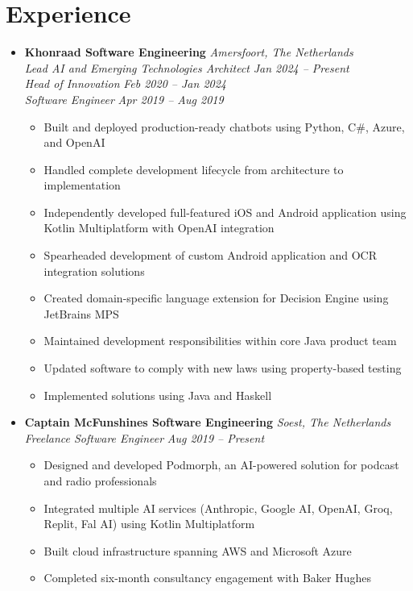 \documentclass[11pt,a4paper]{article}
\begin{document}
\section{Experience}
\begin{itemize}[leftmargin=0pt,label={},itemsep=2em]  %
\item \textbf{Khonraad Software Engineering} \hfill \textit{Amersfoort, The Netherlands}\\[2pt]
\textit{Lead AI and Emerging Technologies Architect} \hfill \textit{Jan 2024 -- Present}\\[2pt]
\textit{Head of Innovation} \hfill \textit{Feb 2020 -- Jan 2024}\\[2pt]
\textit{Software Engineer} \hfill \textit{Apr 2019 -- Aug 2019}\\[1pt]
\begin{itemize}[leftmargin=*,topsep=0pt,parsep=0pt,partopsep=0pt]
    \item Built and deployed production-ready chatbots using Python, C\#, Azure, and OpenAI
    \item Handled complete development lifecycle from architecture to implementation
    \item Independently developed full-featured iOS and Android application using Kotlin Multiplatform with OpenAI integration
    \item Spearheaded development of custom Android application and OCR integration solutions
    \item Created domain-specific language extension for Decision Engine using JetBrains MPS
    \item Maintained development responsibilities within core Java product team
    \item Updated software to comply with new laws using property-based testing
    \item Implemented solutions using Java and Haskell
\end{itemize}

\item \textbf{Captain McFunshines Software Engineering} \hfill \textit{Soest, The Netherlands}\\[2pt]
\textit{Freelance Software Engineer} \hfill \textit{Aug 2019 -- Present}\\[1pt]
\begin{itemize}[leftmargin=*,topsep=0pt,parsep=0pt,partopsep=0pt]
    \item Designed and developed Podmorph, an AI-powered solution for podcast and radio professionals
    \item Integrated multiple AI services (Anthropic, Google AI, OpenAI, Groq, Replit, Fal AI) using Kotlin Multiplatform
    \item Built cloud infrastructure spanning AWS and Microsoft Azure
    \item Completed six-month consultancy engagement with Baker Hughes
\end{itemize}


\end{itemize}
\end{document}
